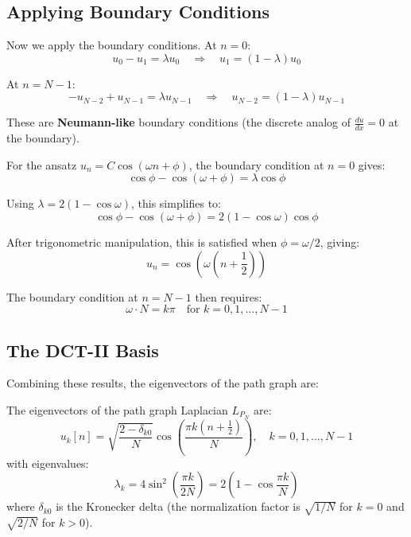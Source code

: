 \begin{notechapter}
\subsection{Applying Boundary Conditions}

Now we apply the boundary conditions. At $n = 0$:
\[
u_0 - u_1 = \lambda u_0 \quad \Rightarrow \quad 
u_1 = (1 - \lambda) u_0
\]

At $n = N-1$:
\[
-u_{N-2} + u_{N-1} = \lambda u_{N-1} \quad \Rightarrow \quad 
u_{N-2} = (1 - \lambda) u_{N-1}
\]

These are \textbf{Neumann-like} boundary conditions (the discrete 
analog of $\frac{du}{dx} = 0$ at the boundary).

For the ansatz $u_n = C \cos(\omega n + \phi)$, the boundary condition 
at $n = 0$ gives:
\[
\cos\phi - \cos(\omega + \phi) = \lambda \cos\phi
\]

Using $\lambda = 2(1 - \cos\omega)$, this simplifies to:
\[
\cos\phi - \cos(\omega + \phi) = 2(1 - \cos\omega)\cos\phi
\]

After trigonometric manipulation, this is satisfied when 
$\phi = \omega/2$, giving:
\[
u_n = \cos\left(\omega\left(n + \frac{1}{2}\right)\right)
\]

The boundary condition at $n = N-1$ then requires:
\[
\omega \cdot N = k\pi \quad \text{for } k = 0, 1, \ldots, N-1
\]

\subsection{The DCT-II Basis}

Combining these results, the eigenvectors of the path graph are:

\begin{theorem}[Path Graph Eigenvectors = DCT-II Basis]
\label{dft-to-gnn:thm:path-dct}
The eigenvectors of the path graph Laplacian $L_{P_N}$ are:
\begin{equation}
u_k[n] = \sqrt{\frac{2 - \delta_{k0}}{N}} \cos\left(\frac{\pi k (n + \frac{1}{2})}{N}\right), 
\quad k = 0, 1, \ldots, N-1
\end{equation}
with eigenvalues:
\begin{equation}
\lambda_k = 4\sin^2\left(\frac{\pi k}{2N}\right) = 
2\left(1 - \cos\frac{\pi k}{N}\right)
\end{equation}
where $\delta_{k0}$ is the Kronecker delta (the normalization factor 
is $\sqrt{1/N}$ for $k=0$ and $\sqrt{2/N}$ for $k > 0$).
\end{theorem}


\end{notechapter}
